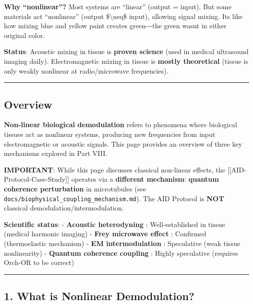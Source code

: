 \textbf{Why ``nonlinear''?} Most systems are ``linear'' (output =
input). But some materials act ``nonlinear'' (output
\$\textbackslash neq\$ input), allowing signal mixing.
It\textquotesingle s like how mixing blue and yellow paint creates
green-\/-\/-the green wasn\textquotesingle t in either original color.

\textbf{Status}: Acoustic mixing in tissue is \textbf{proven science}
(used in medical ultrasound imaging daily). Electromagnetic mixing in
tissue is \textbf{mostly theoretical} (tissue is only weakly nonlinear
at radio/microwave frequencies).

\begin{center}\rule{0.5\linewidth}{0.5pt}\end{center}

\subsection{Overview}\label{overview}

\textbf{Non-linear biological demodulation} refers to phenomena where
biological tissues act as nonlinear systems, producing new frequencies
from input electromagnetic or acoustic signals. This page provides an
overview of three key mechanisms explored in Part VIII.

\textbf{ IMPORTANT}: While this page discusses classical non-linear
effects, the {[}{[}AID-Protocol-Case-Study{]}{]} operates via a
\textbf{different mechanism}: \textbf{quantum coherence perturbation} in
microtubules (see \texttt{docs/biophysical\_coupling\_mechanism.md}).
The AID Protocol is \textbf{NOT} classical demodulation/intermodulation.

\textbf{Scientific status}: - \textbf{Acoustic heterodyning} :
Well-established in tissue (medical harmonic imaging) - \textbf{Frey
microwave effect} : Confirmed (thermoelastic mechanism) - \textbf{EM
intermodulation} : Speculative (weak tissue nonlinearity) -
\textbf{Quantum coherence coupling} : Highly speculative (requires
Orch-OR to be correct)

\begin{center}\rule{0.5\linewidth}{0.5pt}\end{center}

\subsection{1. What is Nonlinear
Demodulation?}\label{what-is-nonlinear-demodulation}

